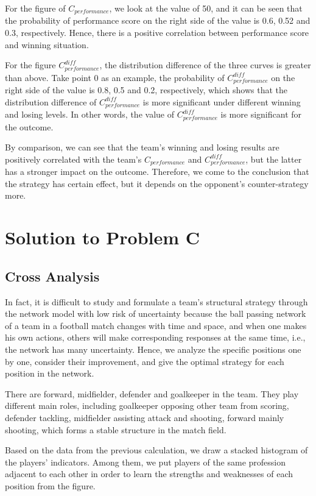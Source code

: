 \documentclass{mcmthesis}
\begin{document}
{For the figure of $C_{performance}$, we look at the value of 50, and it can be seen that the probability of performance score on the right side of the value is 0.6, 0.52 and 0.3, respectively. Hence, there is a positive correlation between performance score and winning situation.

For the figure $C_{performance}^{diff}$, the distribution difference of the three curves is greater than above. Take point 0 as an example, the probability of $C_{performance}^{diff}$ on the right side of the value is 0.8, 0.5 and 0.2, respectively, which shows that the distribution difference of $C_{performance}^{diff}$ is more significant under different winning and losing levels. In other words, the value of $C_{performance}^{diff}$ is more significant for the outcome.

By comparison, we can see that the team's winning and losing results are positively correlated with the team's $C_{performance}$ and $C_{performance}^{diff}$, but the latter has a stronger impact on the outcome. Therefore, we come to the conclusion that the strategy has certain effect, but it depends on the opponent's counter-strategy more.


\section{Solution to Problem C}

\subsection{Cross Analysis}
In fact, it is difficult to study and formulate a team's structural strategy through the network model with low risk of uncertainty because the ball passing network of a team in a football match changes with time and space, and when one makes his own actions, others will make corresponding responses at the same time, i.e., the network has many uncertainty. Hence, we analyze the specific positions one by one, consider their improvement, and give the optimal strategy for each position in the network.

There are forward, midfielder, defender and goalkeeper in the team. They play different main roles, including goalkeeper opposing other team from scoring, defender tackling, midfielder assisting attack and shooting, forward mainly shooting, which forms a stable structure in the match field.

Based on the data from the previous calculation, we draw a stacked histogram of the players' indicators. Among them, we put players of the same profession adjacent to each other in order to learn the strengths and weaknesses of each position from the figure.

}
\end{document}
